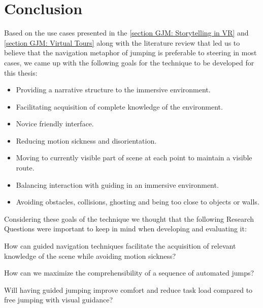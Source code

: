 
\section{Conclusion}
\label{section GJM: Conclusion}
Based on the use cases presented in the \cref{section GJM: Storytelling in VR} and \cref{section GJM: Virtual Tours} along with the literature review that led us to believe that the navigation metaphor of jumping is preferable to steering in most cases, we came up with the following goals for the technique to be developed for this thesis:
\begin{itemize}
	\item Providing a narrative structure to the immersive environment.
	\item Facilitating acquisition of complete knowledge of the environment.
	\item Novice friendly interface.
	\item Reducing motion sickness and disorientation.
	\item Moving to currently visible part of scene at each point to maintain a visible route.
	\item Balancing interaction with guiding in an immersive environment.
	\item Avoiding obstacles, collisions, ghosting and being too close to objects or walls.
\end{itemize}
Considering these goals of the technique we thought that the following Research Questions were important to keep in mind when developing and evaluating it: 
\begin{researchq}
	\label{rq:rq1}
	How can guided navigation techniques facilitate the acquisition of relevant knowledge of the scene while avoiding motion sickness?
\end{researchq}
\begin{researchq}
	\label{rq:rq2}
	How can we maximize the comprehensibility of a sequence of automated jumps?
\end{researchq}
\begin{researchq}
	\label{rq:rq3}
	Will having guided jumping improve comfort and reduce task load compared to free jumping with visual guidance?
\end{researchq}

